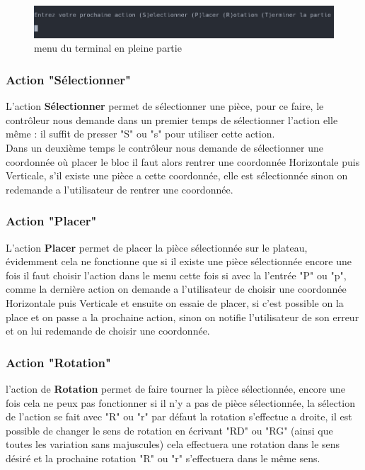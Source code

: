 \documentclass[a4paper,12pt]{article} %
\begin{document}
\begin{figure}[ht]
    \centering
    \includegraphics[width=0.5\linewidth]{images/controleurterminal1.png}
    \caption{menu du terminal en pleine partie}
\end{figure}

\subsubsection{Action "Sélectionner"}
L'action \textbf{Sélectionner} permet de sélectionner une pièce, pour ce faire, le contrôleur nous demande dans un premier temps de sélectionner l'action elle même : il suffit de presser "S" ou "s" pour utiliser cette action. \\
Dans un deuxième temps le contrôleur nous demande de sélectionner une coordonnée où placer le bloc il faut alors rentrer une coordonnée Horizontale puis Verticale, s'il existe une pièce a cette coordonnée, elle est sélectionnée
sinon on redemande a l'utilisateur de rentrer une coordonnée.
\subsubsection{Action "Placer"}
L'action \textbf{Placer} permet de placer la pièce sélectionnée sur le plateau, évidemment cela ne fonctionne que si il existe une pièce sélectionnée
encore une fois il faut choisir l'action dans le menu cette fois si avec la l'entrée "P" ou "p", comme la dernière action on demande a l'utilisateur de
choisir une coordonnée Horizontale puis Verticale et ensuite on essaie de placer, si c'est possible on la place et on passe a la prochaine action, sinon
on notifie l'utilisateur de son erreur et on lui redemande de choisir une coordonnée.
\subsubsection{Action "Rotation"}
l'action de \textbf{Rotation} permet de faire tourner la pièce sélectionnée, encore une fois cela ne peux pas fonctionner si il n'y a pas de pièce
sélectionnée, la sélection de l'action se fait avec "R" ou "r" par défaut la rotation s'effectue a droite, il est possible de changer le sens de rotation
en écrivant "RD" ou "RG" (ainsi que toutes les variation sans majuscules) cela effectuera une rotation dans le sens désiré et la prochaine rotation "R" ou "r"
s'effectuera dans le même sens.
\end{document}
